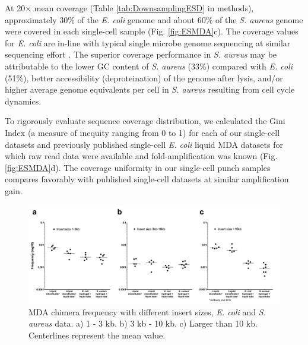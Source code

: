 At 20$\times$ mean coverage (Table \ref{tab:DownsamplingESD} in methods), approximately 30\% of the \textit{E. coli}  genome and about 60\% of the \textit{S. aureus}  genome were covered in each single-cell sample (Fig. \ref{fig:ESMDA}c). The coverage values for \textit{E. coli}  are in-line with typical single microbe genome sequencing at similar sequencing effort \cite{deBourcy:2014ji,Woyke:2011eg}. The superior coverage performance in \textit{S. aureus}  may be attributable to the lower GC content of \textit{S. aureus}  (33\%) compared with \textit{E. coli}  (51\%), better accessibility (deproteination) of the genome after lysis, and\slash or higher average genome equivalents per cell in \textit{S. aureus} resulting from cell cycle dynamics.

To rigorously evaluate sequence coverage distribution, we calculated the Gini Index (a measure of inequity ranging from 0 to 1) for each of our single-cell datasets and previously published single-cell \textit{E. coli} liquid MDA datasets for which raw read data were available and fold-amplification was known (Fig. \ref{fig:ESMDA}d). The coverage uniformity in our single-cell punch samples compares favorably with published single-cell datasets at similar amplification gain.

\begin{figure}
\centering
\includegraphics[keepaspectratio,width=\textwidth]{./figures/SuppFig8}
\caption[MDA chimera frequency with different insert sizes, \textit{E. coli} and \textit{S. aureus} data]{MDA chimera frequency with different insert sizes, \textit{E. coli} and \textit{S. aureus} data. a) 1 - 3 kb. b) 3 kb - 10 kb. c) Larger than 10 kb. Centerlines represent the mean value.}
\label{fig:Chimera10k}
\end{figure}

